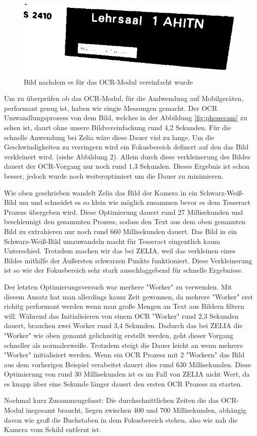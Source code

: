 \begin{figure}
    \centering
    \includegraphics[width=120mm]{media/OCR/compressed}
    \caption{Bild nachdem es für das OCR-Modul vereinfacht wurde}
    \label{ocroptimised}
\end{figure}


\pagebreak


Um zu überprüfen ob das OCR-Modul, für die Andwendung auf Mobilgeräten, performant genug ist, haben wir eingie Messungen gemacht. Der OCR Umwandlungsprozess von dem Bild, welches in der Abbildung \ref{fig:phonecam} zu sehen ist, daurt ohne unsere Bildvereinfachung rund 4,2 Sekunden. Für die schnelle Anwendung bei Zelia wäre diese Dauer viel zu lange. Um die Geschwindigkeiten zu verringern wird ein Fokusbereich definert auf den das Bild verkleinert wird. (siehe Abbildung 2). Allein durch diese verkleinerung des Bildes dauert der OCR-Vorgang nur noch rund 1,3 Sekunden. Dieses Ergebnis ist schon besser, jedoch wurde noch weiteroptimiert um die Dauer zu minimieren. 

Wie oben geschrieben wandelt Zelia das Bild der Kamera in ein Schwarz-Weiß-Bild um und schneidet es so klein wie möglich zusammen bevor es dem Tesseract Prozess übergeben wird. Diese Optimierung dauert rund 27 Millisekunden und beschleunigt den gesammten Prozess, sodass den Text aus dem oben genannten Bild zu extrahieren nur noch rund 660 Millisekunden dauert. Das Bild in ein Schwarz-Weiß-Bild umzuwandeln macht für Tesseract eingentlich kaum Unterschied. Trotzdem machen wir das bei ZELIA, weil das verkleinen eines Bildes mithilfe der Äußersten schwarzen Punkte funktioniert. Diese Verkleinerung ist so wie der Fokusbereich sehr stark ausschlaggebend für schnelle Ergebnisse. 

Der letzten Optimierungsversuch war merhere "Worker" zu verwenden. Mit diesem Ansatz hat man allerdings kaum Zeit gewonnen, da mehrere "Worker" erst richitg performant werden wenn man große Mengen an Text aus Bildern filtern will. Während das Initialisieren von einem OCR "Worker" rund 2,3 Sekunden dauert, brauchen zwei Worker rund 3,4 Sekunden. Dadurch das bei ZELIA die "Worker" wie oben genannt gelichzeitig erstellt werden, geht dieser Vorgang schneller als normalerweiße. Trotzdem steigt die Dauer leicht an wenn mehrere "Worker" initialisiert werden. Wenn ein OCR Prozess mit 2 "Workern" das Bild aus dem vorherigen Beispiel verabeitet dauert dies rund 630 Millisekunden. Diese Optimierung von rund 30 Millisekunden ist es im Fall von ZELIA nicht Wert, da es knapp über eine Sekunde länger dauert den ersten OCR Prozess zu starten.

Nochmal kurz Zusammengefasst: Die durchschnittlichen Zeiten die das OCR-Modul insgesamt braucht, liegen zwischen 400 und 700 Millisekunden, abhängig davon wie groß die Buchstaben in dem Fokusbereich stehen, also wie nah die Kamera vom Schild entfernt ist.

